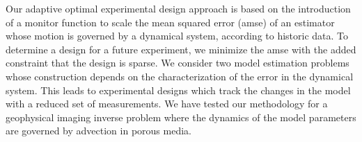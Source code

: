 \documentclass[leqno,onefignum,onetabnum]{siamltexmm}
\begin{document}
Our adaptive optimal experimental design approach is based on the introduction of a monitor function to scale the  mean squared error (amse) of an estimator whose motion is governed by a dynamical system, according to historic data. 
To determine a design for a future experiment, we minimize the amse  with the added constraint that the design is sparse. We consider two model estimation problems whose construction depends on the characterization of the error in the dynamical system. 
This leads to experimental designs which track the changes in the model with a reduced set of measurements.  
We have tested our methodology for a geophysical imaging inverse problem where the dynamics of the  model parameters are governed by advection in porous media. 
\end{document}
